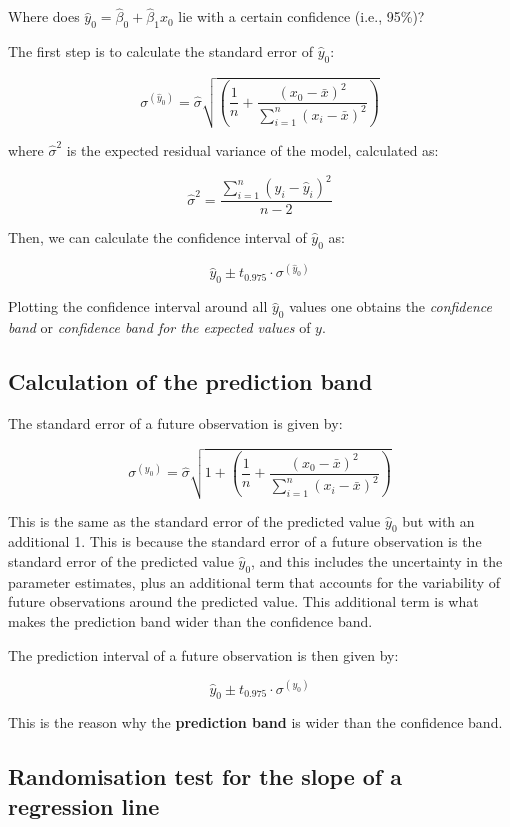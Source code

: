 \documentclass[
  letterpaper,
  8pt,
  a4paper]{book}
\begin{document}
Where does \(\hat y_0 = \hat\beta_0 + \hat\beta_1 x_0\) lie with a
certain confidence (i.e., 95\%)?

The first step is to calculate the standard error of \(\hat y_0\):

\[\sigma^{(\hat y_0)} = \hat\sigma \sqrt{  \left( \frac{1}{n} + \frac{(x_0 - \bar x)^2}{\sum_{i=1}^n (x_i - \bar x)^2} \right) }\]

where \(\hat\sigma^2\) is the expected residual variance of the model,
calculated as:

\[\hat\sigma^2 = \frac{\sum_{i=1}^n (y_i - \hat y_i)^2}{n-2}\]

Then, we can calculate the confidence interval of \(\hat y_0\) as:

\[\hat y_0 \pm t_{0.975} \cdot \sigma^{(\hat y_0)}\]

Plotting the confidence interval around all \(\hat y_0\) values one
obtains the \emph{confidence band} or \emph{confidence band for the
expected values} of \(y\).

\subsection*{Calculation of the prediction
band}\label{calculation-of-the-prediction-band}

The standard error of a future observation is given by:

\[\sigma^{(y_0)} = \hat\sigma \sqrt{ 1 + \left( \frac{1}{n} + \frac{(x_0 - \bar x)^2}{\sum_{i=1}^n (x_i - \bar x)^2} \right) }\]

This is the same as the standard error of the predicted value
\(\hat y_0\) but with an additional 1. This is because the standard
error of a future observation is the standard error of the predicted
value \(\hat y_0\), and this includes the uncertainty in the parameter
estimates, plus an additional term that accounts for the variability of
future observations around the predicted value. This additional term is
what makes the prediction band wider than the confidence band.

The prediction interval of a future observation is then given by:

\[\hat y_0 \pm t_{0.975} \cdot \sigma^{(y_0)}\]

This is the reason why the \textbf{prediction band} is wider than the
confidence band.

\subsection*{Randomisation test for the slope of a regression
line}\label{randomisation-test-for-the-slope-of-a-regression-line}
\end{document}
